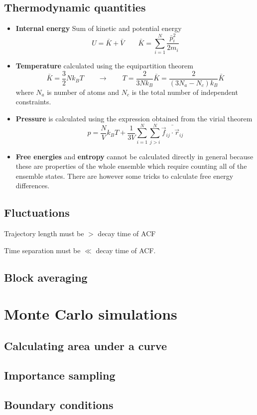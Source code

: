 \documentclass{report}
\begin{document}
\subsection{Thermodynamic quantities}
\begin{itemize}
\item \textbf{Internal energy} Sum of kinetic and potential energy
\[ U = \bar{K} + \bar{V} \qquad \bar{K} = \sum^N_{i=1}\frac{\bar{p}_i^2}{2m_i} \]
\item \textbf{Temperature} calculated using the equipartition theorem
\[ \bar{K} = \frac{3}{2}Nk_B T \qquad \to \qquad T = \frac{2}{3Nk_B}\bar{K} = \frac{2}{(3N_a - N_c)k_B}\bar{K} \]
where $N_a$ is number of atoms and $N_c$ is the total number of independent constraints.
\item \textbf{Pressure} is calculated using the expression obtained from the virial theorem
\[ p = \frac{N}{V}k_B T + \frac{1}{3V}\sum^N_{i=1}\sum^N_{j>i}\bar{\vec{f}_{ij}\cdot \vec{r}_{ij}} \]
\item \textbf{Free energies} and \textbf{entropy} cannot be calculated directly in general because these are properties of the whole ensemble which require counting all of the ensemble states. There are however some tricks to calculate free energy differences.
\end{itemize}

\subsection{Fluctuations}
Trajectory length must be $>$ decay time of ACF

Time separation must be $\ll$ decay time of ACF.

\subsection{Block averaging}

\section{Monte Carlo simulations}
\subsection{Calculating area under a curve}
\subsection{Importance sampling}
\subsection{Boundary conditions}
\end{document}

